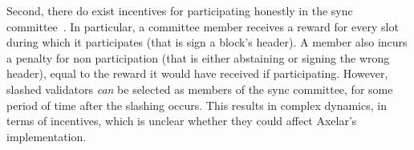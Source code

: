 Second, there do exist incentives for participating honestly in the sync
committee~\cite{sync-committee-incentives}. In particular, a committee member
receives a reward for every slot during which it participates (that is sign a
block's header). A member also incurs a penalty for non participation (that is
either abstaining or signing the wrong header), equal to the reward it would
have received if participating.
However, slashed validators \emph{can} be selected as members of the sync
committee, for some period of time after the slashing occurs. This results in
complex dynamics, in terms of incentives, which is unclear whether they could
affect Axelar's implementation.
